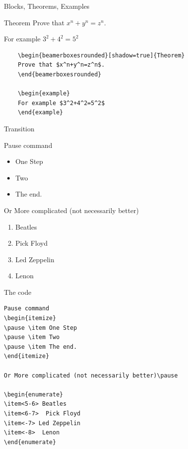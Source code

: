 \documentclass[professionalfonts,t]{beamer}
\begin{document}
\begin{frame}[containsverbatim]{Blocks, Theorems, Examples}

\begin{beamerboxesrounded}[shadow=true]{Theorem}
Prove that $x^n+y^n=z^n$.
\end{beamerboxesrounded}

\begin{example}
For example $3^2+4^2=5^2$
\end{example}

\begin{verbatim}
    \begin{beamerboxesrounded}[shadow=true]{Theorem}
    Prove that $x^n+y^n=z^n$.
    \end{beamerboxesrounded}

    \begin{example}
    For example $3^2+4^2=5^2$
    \end{example}
\end{verbatim}
\end{frame}
\begin{frame}{Transition}

Pause command
\begin{itemize}
\pause \item One Step
\pause \item Two
\pause \item The end.
\end{itemize}

Or More complicated (not necessarily better)\pause

\begin{enumerate}
\item<5-6> Beatles
\item<6-7>  Pick Floyd
\item<-7> Led Zeppelin
\item<-8>  Lenon
\end{enumerate}
\end{frame}
\begin{frame}[containsverbatim]{The code}
\begin{verbatim}
Pause command
\begin{itemize}
\pause \item One Step
\pause \item Two
\pause \item The end.
\end{itemize}

Or More complicated (not necessarily better)\pause

\begin{enumerate}
\item<5-6> Beatles
\item<6-7>  Pick Floyd
\item<-7> Led Zeppelin
\item<-8>  Lenon
\end{enumerate}

\end{verbatim}
\end{frame}
\end{document}
